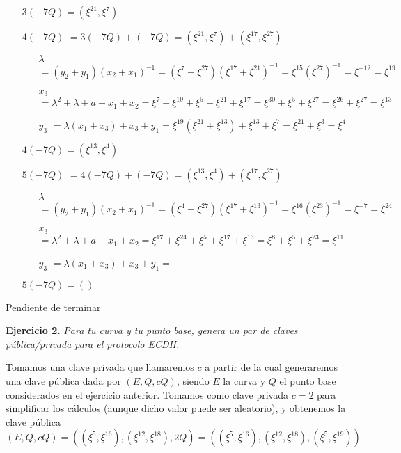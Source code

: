 \documentclass[fleqn]{article}
\begin{document}
\begin{itemize}
\begin{itemize}
            \end{itemize}
            $3(-7Q) = (\xi^{21}, \xi^{7})$
        \item[$4(-7Q)$] $ = 3(-7Q) + (-7Q) = (\xi^{21}, \xi^{7}) + (\xi^{17}, \xi^{27})$
            \begin{itemize}
                \item[$\lambda$] $ = (y_2 + y_1)(x_2 + x_1)^{-1} = (\xi^{7} + \xi^{27}) (\xi^{17} + \xi^{21})^{-1} = \xi^{15} (\xi^{27})^{-1} = \xi^{-12} = \xi^{19}$
                \item[$x_3$] $ = \lambda^2 + \lambda + a + x_1 + x_2 = \xi^{7} + \xi^{19} + \xi^{5} + \xi^{21} + \xi^{17} = \xi^{30} + \xi^{5} + \xi^{27} = \xi^{26} + \xi^{27} = \xi^{13}$
                \item[$y_3$] $ = \lambda(x_1 + x_3) + x_3 + y_1 = \xi^{19} (\xi^{21} + \xi^{13}) + \xi^{13} + \xi^{7} = \xi^{21} + \xi^{3} = \xi^{4}$
            \end{itemize}
            $4(-7Q) = (\xi^{13}, \xi^{4})$
        \item[$5(-7Q)$] $ = 4(-7Q) + (-7Q) = (\xi^{13}, \xi^{4}) + (\xi^{17}, \xi^{27})$
            \begin{itemize}
                \item[$\lambda$] $ = (y_2 + y_1)(x_2 + x_1)^{-1} = (\xi^{4} + \xi^{27}) (\xi^{17} + \xi^{13})^{-1} = \xi^{16} (\xi^{23})^{-1} = \xi^{-7} = \xi^{24}$
                \item[$x_3$] $ = \lambda^2 + \lambda + a + x_1 + x_2 = \xi^{17} + \xi^{24} + \xi^{5} + \xi^{17} + \xi^{13} = \xi^{8} + \xi^{5} + \xi^{23} = \xi^{11}$
                \item[$y_3$] $ = \lambda(x_1 + x_3) + x_3 + y_1 = $
            \end{itemize}
            $5(-7Q) = ()$

    \end{itemize}

    Pendiente de terminar



    \newpage
    \textbf{Ejercicio 2. }\textit{Para tu curva y tu punto base, genera un par de claves pública/privada para el protocolo ECDH.}
    \vspace{0.5cm}

    Tomamos una clave privada que llamaremos $c$ a partir de la cual generaremos una clave pública dada por $(E, Q, cQ)$, siendo $E$ la curva
    y $Q$ el punto base considerados en el ejercicio anterior. Tomamos como clave privada $c = 2$ para simplificar los cálculos (aunque dicho valor puede ser aleatorio), 
    y obtenemos la clave pública 
    $$(E, Q, cQ) = ((\xi^5, \xi^{16}), (\xi^{12}, \xi^{18}), 2Q) = ((\xi^5, \xi^{16}), (\xi^{12}, \xi^{18}), (\xi^{5}, \xi^{19}))$$
\end{document}
